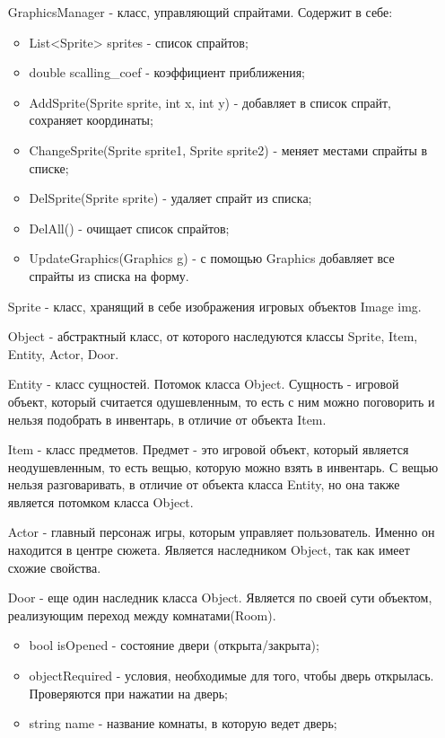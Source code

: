 \begin{enumerate}
	\item[GraphicsManager] - класс, управляющий спрайтами. Содержит в себе:
	\begin{itemize}
		\item List<Sprite> sprites - список спрайтов;
		\item double scalling\_coef - коэффициент приближения;
		\item AddSprite(Sprite sprite, int x, int y) - добавляет в список спрайт, сохраняет координаты;
		\item ChangeSprite(Sprite sprite1, Sprite sprite2) - меняет местами спрайты в списке;
		\item DelSprite(Sprite sprite) - удаляет спрайт из списка;
		\item DelAll() - очищает список спрайтов;
		\item UpdateGraphics(Graphics g) - с помощью Graphics добавляет все спрайты из списка на форму.
	\end{itemize}
	\item[Sprite] - класс, хранящий в себе изображения игровых объектов Image img.
	\item[Object] - абстрактный класс, от которого наследуются классы Sprite, Item, Entity, Actor, Door.
	\item[Entity] - класс сущностей. Потомок класса Object. Сущность - игровой объект, который считается одушевленным, то есть с ним можно поговорить и нельзя подобрать в инвентарь, в отличие от объекта Item.
	\item[Item] - класс предметов. Предмет - это игровой объект, который является неодушевленным, то есть вещью, которую можно взять в инвентарь. С вещью нельзя разговаривать, в отличие от объекта класса Entity, но она также является потомком класса Object.
	\item[Actor] - главный персонаж игры, которым управляет пользователь. Именно он находится в центре сюжета. Является наследником Object, так как имеет схожие свойства.
	\item[Door] - еще один наследник класса Object. Является по своей сути объектом, реализующим переход между комнатами(Room).
	\begin{itemize}
		\item bool isOpened - состояние двери (открыта/закрыта);
		\item objectRequired - условия, необходимые для того, чтобы дверь открылась. Проверяются при нажатии на дверь;
		\item string name - название комнаты, в которую ведет дверь;

\end{itemize}
\end{enumerate}
